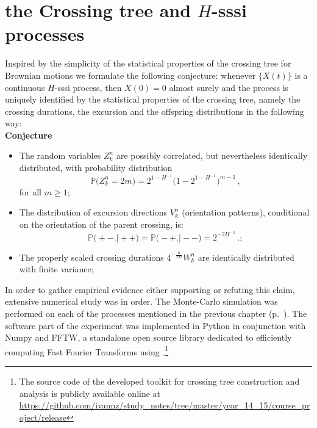 \documentclass[a4paper]{article}
\newcommand{\pr}{\mathbb{P}}
\newcommand{\Dcal}{\mathcal{D}}
\begin{document}


\section{the Crossing tree and $H$-sssi processes} %
\label{sec:experiment_setup}

Inspired by the simplicity of the statistical properties of the crossing tree for
Brownian motions we formulate the following conjecture: whenever $\{X(t)\}$ is a
continuous $H$-sssi process, then $X(0)= 0$ almost surely and the process is uniquely
identified by the statistical properties of the crossing tree, namely the crossing
durations, the excursion and the offspring distributions in the following way:\\
\noindent \textbf{Conjecture}\begin{itemize}
    \item The random variables $Z_k^n$ are possibly correlated, but nevertheless
    identically distributed, with probability distribution
    \[ \pr\bigl(Z_k^n=2m\bigr) = 2^{1-H^{-1}}\bigl(1-2^{1-H^{-1}}\bigr)^{m-1} \,,\]
    for all $m\geq 1$;
    \item The distribution of excursion directions $V_k^n$ (orientation patterns),
    conditional on the orientation of the parent crossing, is:
    \[ \pr\bigl( +- \bigr.\bigl\lvert ++ \bigr)
	= \pr\bigl( -+ \bigr.\bigl\lvert -- \bigr)
	= 2^{-2H^{-1}} \,.; \]
	\item The properly scaled crossing durations $4^{-\frac{n}{2H}} W_k^n$
	are identically distributed with finite variance;
\end{itemize}

In order to gather empirical evidence either supporting or refuting this claim,
extensive numerical study was in order. The Monte-Carlo simulation was performed
on each of the processes mentioned in the previous chapter (p.~\pageref{sec:h_sssi_processes}).
The software part of the experiment was implemented in Python in conjunction with
Numpy and FFTW, a standalone open source library dedicated to efficiently computing
Fast Fourier Transforms using .\footnote{The source code of the developed toolkit for crossing tree
construction and analysis is publicly available online at
\url{https://github.com/ivannz/study_notes/tree/master/year_14_15/course_project/release}}
\end{document}
